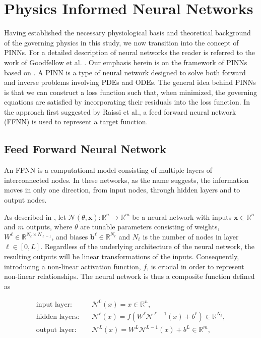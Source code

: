 \section{Physics Informed Neural Networks}
%
Having established the necessary physiological basis and theoretical background of the governing physics in this study, we now transition into the concept of PINNs. For a detailed description of neural networks the reader is referred to the work of Goodfellow et al. \cite{Goodfellow}. Our emphasis herein is on the framework of PINNs based on \cite{lu2021deepxde}.
A PINN is a type of neural network designed to solve both forward and inverse problems involving PDEs and ODEs. The general idea behind PINNs is that we can construct a loss function such that, when minimized, the
governing equations are satisfied by incorporating their
residuals into the loss function. In the approach first suggested by Raissi et al.\cite{RAISSI2019686}, a feed forward neural network (FFNN) is used to represent a target function. 

\subsection{Feed Forward Neural Network}
An FFNN is a computational model consisting of multiple layers of interconnected nodes. In these networks, as the name suggests, the information moves in only one direction, from input nodes, through hidden layers and to output nodes.

As described in \cite{lu2021deepxde}, let $\mathcal{N}(\theta,\mathbf{x}):\mathbb{R}^{n}\rightarrow \mathbb{R}^{m}$ be a neural network with inputs $\mathbf{x}\in \mathbb{R}^n$ and $m$ outputs, where $\theta$ are tunable parameters consisting of weights, $W^{\ell}\in \mathbb{R}^{N_{\ell}\times N_{\ell-1}}$, and biases $\mathbf{b}^{\ell}\in \mathbb{R}^{N_{\ell}}$ and $N_{\ell}$ is the number of nodes in layer $\ell \in [0,L]$. Regardless of the underlying architecture of the neural network, the resulting outputs will be linear transformations of the inputs. Consequently, introducing a non-linear activation function, $f$, is crucial in order to represent non-linear relationships. The neural network is thus a composite function defined as

\begin{align*}
\text{input layer:} \quad &\mathcal{N}^{0}(x) = x \in \mathbb{R}^{n}, \\
\text{hidden layers:} \quad &\mathcal{N}^{\ell}(x) = f(W^{\ell}\mathcal{N}^{\ell-1}(x) + b^{\ell}) \in \mathbb{R}^{N_{\ell}}, \\
\text{output layer:} \quad &\mathcal{N}^{L}(x) = W^{L}\mathcal{N}^{L-1}(x) + b^{L} \in \mathbb{R}^{m}, \\
\end{align*}


